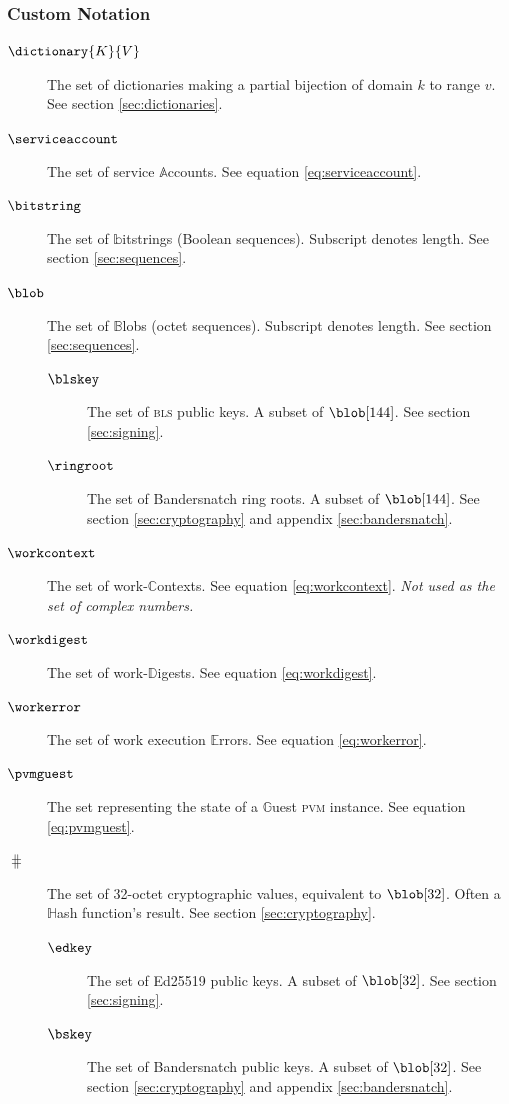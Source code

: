 \subsubsection{Custom Notation}
\begin{description}
  \item[$\dictionary{K}{V}$] The set of dictionaries making a partial bijection of domain $k$ to range $v$. See section \ref{sec:dictionaries}.
  \item[$\serviceaccount$] The set of service $\mathbb{A}$ccounts. See equation \ref{eq:serviceaccount}.
  \item[$\bitstring$] The set of $\mathbb{b}$itstrings (Boolean sequences). Subscript denotes length. See section \ref{sec:sequences}.
  \item[$\blob$] The set of $\mathbb{B}$lobs (octet sequences). Subscript denotes length. See section \ref{sec:sequences}.
  \begin{description}
    \item[$\blskey$] The set of \textsc{bls} public keys. A subset of $\blob[144]$. See section \ref{sec:signing}.
    \item[$\ringroot$] The set of Bandersnatch ring roots. A subset of $\blob[144]$. See section \ref{sec:cryptography} and appendix \ref{sec:bandersnatch}.
  \end{description}
  \item[$\workcontext$] The set of work-$\mathbb{C}$ontexts. See equation \ref{eq:workcontext}. \emph{Not used as the set of complex numbers.}
  \item[$\workdigest$] The set of work-$\mathbb{D}$igests. See equation \ref{eq:workdigest}.
  \item[$\workerror$] The set of work execution $\mathbb{E}$rrors. See equation \ref{eq:workerror}.
  \item[$\pvmguest$] The set representing the state of a $\mathbb{G}$uest \textsc{pvm} instance. See equation \ref{eq:pvmguest}.
  \item[$\hash$] The set of 32-octet cryptographic values, equivalent to $\blob[32]$. Often a $\mathbb{H}$ash function's result. See section \ref{sec:cryptography}.
  \begin{description}
    \item[$\edkey$] The set of Ed25519 public keys. A subset of $\blob[32]$. See section \ref{sec:signing}.
    \item[$\bskey$] The set of Bandersnatch public keys. A subset of $\blob[32]$. See section \ref{sec:cryptography} and appendix \ref{sec:bandersnatch}.

\end{description}
\end{description}
